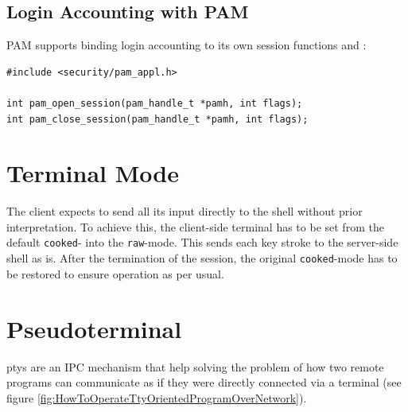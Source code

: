 \documentclass[10pt,a4paper,titlepage,twoside,english,final]{zhawreprt}
\begin{document}
\subsection{Login Accounting with PAM}\label{ssec:DesignLoginAccountingWithPAM}
\gls{PAM} supports binding login accounting to its own session functions \cite{pam_open_session} and \cite{pam_close_session}:
\setlistingC
\begin{lstlisting}[caption={\gls{PAM} session management},label=lst:PAMSessionManagement]
#include <security/pam_appl.h>

int pam_open_session(pam_handle_t *pamh, int flags);
int pam_close_session(pam_handle_t *pamh, int flags);
\end{lstlisting}

\section{Terminal Mode}\label{sec:DesignTerminalMode}
The client expects to send all its input directly to the \gls{shell} without prior interpretation.
To achieve this, the client-side \gls{terminal} has to be set from the default \texttt{cooked}- into the \texttt{raw}-mode\citep[p.1309]{KerriskTLPI}.
This sends each key stroke to the server-side \gls{shell} as is.
After the termination of the session, the original \texttt{cooked}-mode has to be restored to ensure operation as per usual.


\newpage
\section{Pseudoterminal}\label{sec:DesignPseudoterminal}
\glspl{pty} are an \gls{IPC} mechanism that help solving the problem of how two remote programs can communicate as if they were directly connected via a \gls{terminal} (see figure \ref{fig:HowToOperateTtyOrientedProgramOverNetwork}).
\end{document}
